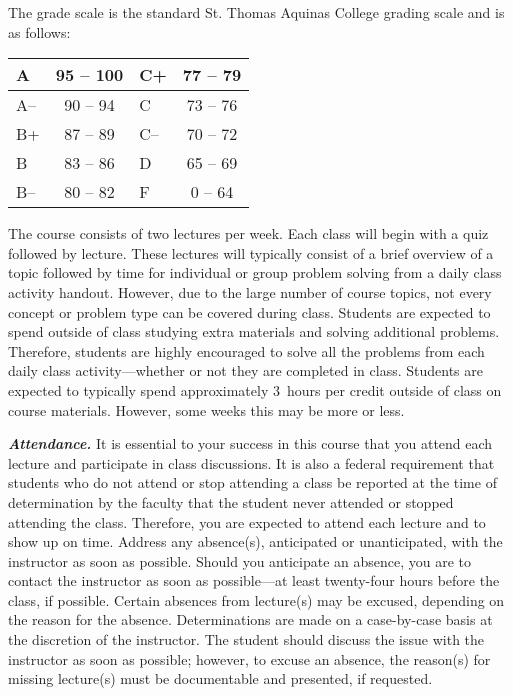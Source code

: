 \documentclass[11pt,letterpaper]{article}
\begin{document}
The grade scale is the standard St. Thomas Aquinas College grading scale and is as follows: \par
        \begin{table}[!ht]
        \centering
        \begin{tabular}{|l||c|l||c|} \hline
        A & 95 -- 100 & C+ & 77 -- 79 \\ \hline
        A-- & 90 -- 94 & C & 73 -- 76 \\ \hline
        B+ & 87 -- 89 & C-- & 70 -- 72 \\ \hline
        B & 83 -- 86 & D & 65 -- 69 \\ \hline
        B-- & 80 -- 82 & F & 0 -- 64 \\ \hline
        \end{tabular}
        \end{table} \pspace



The course consists of two lectures per week. Each class will begin with a quiz followed by lecture. These lectures will typically consist of a brief overview of a topic followed by time for individual or group problem solving from a daily class activity handout. However, due to the large number of course topics, not every concept or problem type can be covered during class. Students are expected to spend outside of class studying extra materials and solving additional problems. Therefore, students are highly encouraged to solve all the problems from each daily class activity---whether or not they are completed in class. Students are expected to typically spend approximately 3~hours per credit outside of class on course materials. However, some weeks this may be more or less. \sectionbreak



{\itshape\bfseries\color{stacred}Attendance.} It is essential to your success in this course that you attend each lecture and participate in class discussions. It is also a federal requirement that students who do not attend or stop attending a class be reported at the time of determination by the faculty that the student never attended or stopped attending the class. Therefore, you are expected to attend each lecture and to show up on time. Address any absence(s), anticipated or unanticipated, with the instructor as soon as possible. Should you anticipate an absence, you are to contact the instructor as soon as possible---at least twenty-four hours before the class, if possible.  Certain absences from lecture(s) may be excused, depending on the reason for the absence. Determinations are made on a case-by-case basis at the discretion of the instructor. The student should discuss the issue with the instructor as soon as possible; however, to excuse an absence, the reason(s) for missing lecture(s) must be documentable and presented, if requested. \pspace
\end{document}
